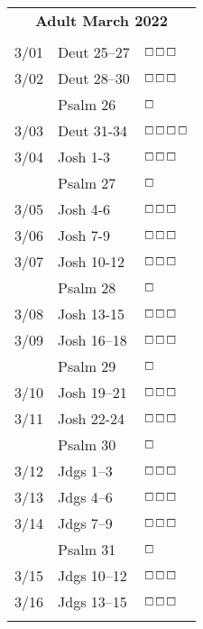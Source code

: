 \documentclass[10pt,landscape,letterpaper]{article}
\begin{document}
\begin{multicols}{5}

\begin{tabular}{p{0.15in}p{0.7in}p{0.5in}}
\multicolumn{3}{c}{\textbf{Adult March 2022}} \\
& & \\
3/01 & Deut 25--27 & $\boxempty$$\boxempty$$\boxempty$ \\
3/02 & Deut 28--30 & $\boxempty$$\boxempty$$\boxempty$ \\
 & \textcolor[rgb]{0.98,0.00,0.00}{Psalm 26} & \textcolor[rgb]{1.00,0.00,0.00}{$\boxempty$} \\
3/03 & Deut 31-34 & $\boxempty$$\boxempty$$\boxempty$$\boxempty$ \\
3/04 & Josh 1-3 & $\boxempty$$\boxempty$$\boxempty$ \\
 & \textcolor[rgb]{0.98,0.00,0.00}{Psalm 27} & \textcolor[rgb]{1.00,0.00,0.00}{$\boxempty$} \\
3/05 & Josh 4-6 & $\boxempty$$\boxempty$$\boxempty$ \\
3/06 & Josh 7-9 & $\boxempty$$\boxempty$$\boxempty$ \\
3/07 & Josh 10-12 & $\boxempty$$\boxempty$$\boxempty$ \\
 & \textcolor[rgb]{0.98,0.00,0.00}{Psalm 28} & \textcolor[rgb]{1.00,0.00,0.00}{$\boxempty$} \\
3/08 & Josh 13-15 & $\boxempty$$\boxempty$$\boxempty$ \\
3/09 & Josh 16--18 & $\boxempty$$\boxempty$$\boxempty$ \\
 & \textcolor[rgb]{0.98,0.00,0.00}{Psalm 29} & \textcolor[rgb]{1.00,0.00,0.00}{$\boxempty$} \\
3/10 & Josh 19--21 & $\boxempty$$\boxempty$$\boxempty$ \\
3/11 & Josh 22-24 & $\boxempty$$\boxempty$$\boxempty$ \\
 & \textcolor[rgb]{0.98,0.00,0.00}{Psalm 30} & \textcolor[rgb]{1.00,0.00,0.00}{$\boxempty$} \\
3/12 & Jdgs 1--3 & $\boxempty$$\boxempty$$\boxempty$ \\
3/13 & Jdgs 4--6 & $\boxempty$$\boxempty$$\boxempty$ \\
3/14 & Jdgs 7--9 & $\boxempty$$\boxempty$$\boxempty$ \\
 & \textcolor[rgb]{0.98,0.00,0.00}{Psalm 31} & \textcolor[rgb]{1.00,0.00,0.00}{$\boxempty$} \\
3/15 & Jdgs 10--12 & $\boxempty$$\boxempty$$\boxempty$ \\
3/16 & Jdgs 13--15 & $\boxempty$$\boxempty$$\boxempty$ \\
$$
\end{tabular}
\end{multicols}
\end{document}

